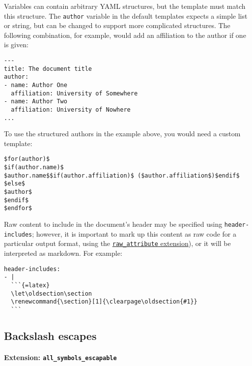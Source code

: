 \documentclass[]{article}
\begin{document}
Variables can contain arbitrary YAML structures, but the template must
match this structure. The \texttt{author} variable in the default
templates expects a simple list or string, but can be changed to support
more complicated structures. The following combination, for example,
would add an affiliation to the author if one is given:

\begin{verbatim}
---
title: The document title
author:
- name: Author One
  affiliation: University of Somewhere
- name: Author Two
  affiliation: University of Nowhere
...
\end{verbatim}

To use the structured authors in the example above, you would need a
custom template:

\begin{verbatim}
$for(author)$
$if(author.name)$
$author.name$$if(author.affiliation)$ ($author.affiliation$)$endif$
$else$
$author$
$endif$
$endfor$
\end{verbatim}

Raw content to include in the document's header may be specified using
\texttt{header-includes}; however, it is important to mark up this
content as raw code for a particular output format, using the
\protect\hyperlink{extension-raw_attribute}{\texttt{raw\_attribute}
extension}), or it will be interpreted as markdown. For example:

\begin{verbatim}
header-includes:
- |
  ```{=latex}
  \let\oldsection\section
  \renewcommand{\section}[1]{\clearpage\oldsection{#1}}
  ```
\end{verbatim}

\hypertarget{backslash-escapes}{%
\subsection{Backslash escapes}\label{backslash-escapes}}

\hypertarget{extension-all_symbols_escapable}{%
\paragraph{\texorpdfstring{Extension:
\texttt{all\_symbols\_escapable}}{Extension: all\_symbols\_escapable}}\label{extension-all_symbols_escapable}}
\end{document}
